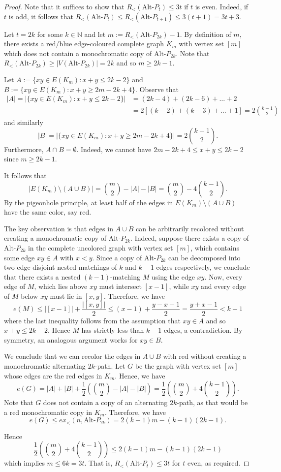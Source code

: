 \documentclass[10pt,a4paper]{amsart}
\begin{document}
\begin{proof}
    Note that it suffices to show that $R_<(\text{Alt-}P_{t})\le3t$ if $t$ is even.
    Indeed, if $t$ is odd, it follows that $R_<(\text{Alt-}P_{t})\le R_<(\text{Alt-}P_{t+1})\le3(t+1)=3t+3$.

    Let $t=2k$ for some $k\in\mathbb N$ and let $m:=R_<(\text{Alt-}P_{2k})-1$.
    By definition of $m$, there exists a red/blue edge-coloured complete graph $K_m$ with vertex set $[m]$ which does not contain a monochromatic copy of $\text{Alt-}P_{2k}$.
    Note that $R_<(\text{Alt-}P_{2k})\ge|V(\text{Alt-}P_{2k})|=2k$ and so $m\ge2k-1$.

    Let $A:=\{xy\in E(K_m):x+y\le 2k-2\}$ and $B:=\{xy\in E(K_m):x+y\ge 2m-2k+4\}$.
    Observe that 
    \begin{align*}
    |A|=|\{xy\in E(K_m):x+y\le 2k-2\}| &=(2k-4)+(2k-6)+\dots+2\\
    & =2[(k-2)+(k-3)+\dots+1]=2\binom{k-1}{2}
    \end{align*}
    and similarly
    $$|B|=|\{xy\in E(K_m):x+y\ge 2m-2k+4\}|=2\binom{k-1}{2}.$$
    Furthermore, $A\cap B=\emptyset$.
    Indeed, we cannot have $2m-2k+4\le x+y\le 2k-2$ since $m\ge2k-1$.

    It follows that
    $$|E(K_m)\setminus(A\cup B)|=\binom{m}{2}-|A|-|B|=\binom{m}{2}-4\binom{k-1}{2}.$$
    By the pigeonhole principle, at least half of the edges in $E(K_m)\setminus(A\cup B)$ have the same color, say red.

    The key observation is that edges in $A\cup B$ can be arbitrarily recolored without creating a monochromatic copy of $\text{Alt-}P_{2k}$.
    Indeed, suppose there exists a copy of $\text{Alt-}P_{2k}$ in the complete uncolored graph with vertex set $[m]$, which contains some edge $xy\in A$ with $x<y$.
    Since a copy of $\text{Alt-}P_{2k}$ can be decomposed into two edge-disjoint nested matchings of $k$ and $k-1$ edges respectively, we conclude that there exists a nested $(k-1)$-matching $M$ using the edge $xy$.
    Now, every edge of $M$, which lies above $xy$ must intersect $[x-1]$, while $xy$ and every edge of $M$ below $xy$ must lie in $[x,y]$.
    Therefore, we have
    $$e(M)\le|[x-1]|+\frac{|[x,y]|}{2}\le(x-1)+\frac{y-x+1}{2}=\frac{y+x-1}{2}<k-1$$
    where the last inequality follows from the assumption that $xy\in A$ and so $x+y\le 2k-2$.
    Hence $M$ has strictly less than $k-1$ edges, a contradiction.
    By symmetry, an analogous argument works for $xy\in B$.

    We conclude that we can recolor the edges in $A\cup B$ with red without creating a monochromatic alternating $2k$-path.
    Let $G$ be the graph with vertex set $[m]$ whose edges are the red edges in $K_m$.
    Hence, we have
    $$e(G)=|A|+|B|+\frac{1}{2}\left(\binom{m}{2}-|A|-|B|\right)=\frac{1}{2}\left(\binom{m}{2}+4\binom{k-1}{2}\right).$$
    Note that $G$ does not contain a copy of an alternating $2k$-path, as that would be a red monochromatic copy in $K_m$.
    Therefore, we have
    $$e(G)\le ex_<(n,\text{Alt-}P_{2k})=2(k-1)m-(k-1)(2k-1).$$

    Hence 
    $$\frac{1}{2}\left(\binom{m}{2}+4\binom{k-1}{2}\right)\le 2(k-1)m-(k-1)(2k-1)$$
    which implies $m\le6k=3t$.
    That is, $R_<(\text{Alt-}P_{t})\le3t$ for $t$ even, as required.
\end{proof}
\end{document}

